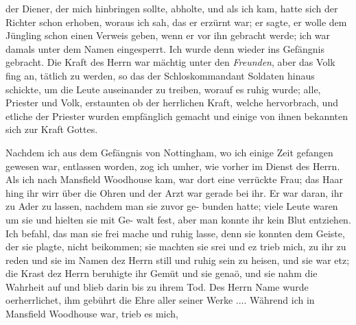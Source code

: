 der Diener, der mich hinbringen sollte, abholte, und als ich kam,
hatte sich der Richter schon erhoben, woraus ich sah, das er 
erzürnt war; er sagte, er wolle dem Jüngling schon einen Verweis
geben, wenn er vor ihn gebracht werde; ich war damals unter
dem Namen  eingesperrt. Ich wurde denn wieder
ins Gefängnis gebracht. Die Kraft des Herrn war mächtig
unter den \textit{Freunden}, aber das Volk fing an, tätlich zu
werden, so das der Schloskommandant Soldaten hinaus schickte,
um die Leute auseinander zu treiben, worauf es ruhig wurde;
alle, Priester und Volk, erstaunten ob der herrlichen Kraft, welche
hervorbrach, und etliche der Priester wurden empfänglich gemacht
und einige von ihnen bekannten sich zur Kraft Gottes.

Nachdem ich aus dem Gefängnis von Nottingham, wo ich
einige Zeit gefangen gewesen war, entlassen worden, zog ich
umher, wie vorher im Dienst des Herrn. Als ich 
nach Mansfield
Woodhouse kam, war dort eine verrückte Frau; das Haar hing
ihr wirr über die Ohren und der Arzt war gerade bei ihr. Er
war daran, ihr zu Ader zu lassen, nachdem man sie zuvor ge-
bunden hatte; viele Leute waren um sie und hielten sie mit Ge-
walt fest, aber man konnte ihr kein Blut entziehen. Ich befahl,
das man sie frei mache und ruhig lasse, denn sie konnten dem
Geiste, der sie plagte, nicht beikommen; sie machten sie srei und
ez trieb mich, zu ihr zu reden und sie im Namen dez Herrn still
und ruhig sein zu heisen, und sie war etz; die Krast dez Herrn
beruhigte ihr Gemüt und sie genaö, und sie nahm die Wahrheit
auf und blieb darin bis zu ihrem Tod. Des Herrn Name wurde
oerherrlichet, ihm gebührt die Ehre aller seiner Werke ....
Während ich in Mansfield Woodhouse war, trieb es mich,


